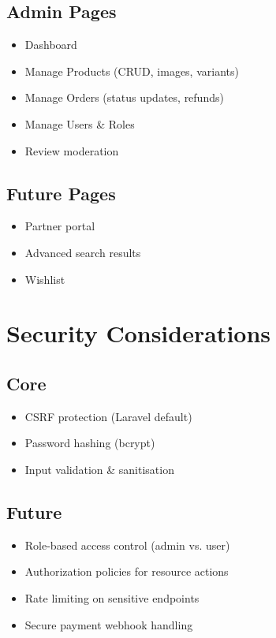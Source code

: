 \documentclass[12pt,a4paper]{article}
\begin{document}
\subsection{Admin Pages}
\begin{itemize}[noitemsep]
    \item Dashboard
    \item Manage Products (CRUD, images, variants)
    \item Manage Orders (status updates, refunds)
    \item Manage Users \& Roles
    \item Review moderation
\end{itemize}

\subsection{Future Pages}
\begin{itemize}[noitemsep]
    \item Partner portal
    \item Advanced search results
    \item Wishlist
\end{itemize}

\section{Security Considerations}

\subsection{Core}
\begin{itemize}[noitemsep]
    \item CSRF protection (Laravel default)
    \item Password hashing (bcrypt)
    \item Input validation \& sanitisation
\end{itemize}

\subsection{Future}
\begin{itemize}[noitemsep]
    \item Role-based access control (admin vs. user)
    \item Authorization policies for resource actions
    \item Rate limiting on sensitive endpoints
    \item Secure payment webhook handling
\end{itemize}
\end{document}
